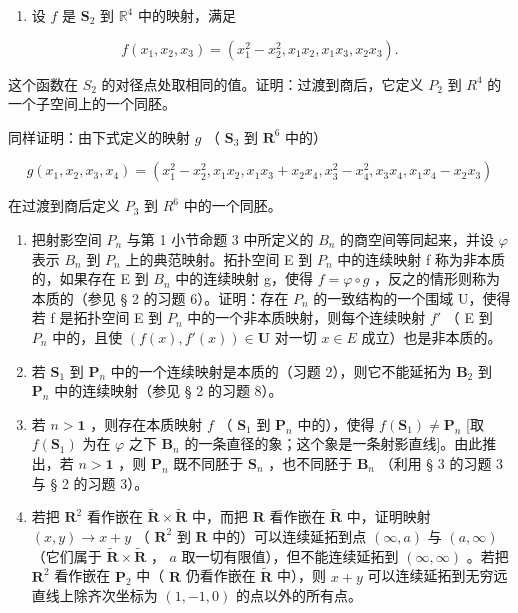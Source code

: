 \ExerciseSection

\begin{enumerate}
\def\labelenumi{\arabic{enumi})}
\tightlist
\item
  设 \(f\) 是 \(\mathbf{S}_2\) 到 \(\mathbb{R}^4\) 中的映射，满足
\end{enumerate}

\[
f \left(x _ {1}, x _ {2}, x _ {3}\right) = \left(x _ {1} ^ {2} - x _ {2} ^ {2}, x _ {1} x _ {2}, x _ {1} x _ {3}, x _ {2} x _ {3}\right).
\]

这个函数在 \(S_{2}\) 的对径点处取相同的值。证明：过渡到商后，它定义 \(P_{2}\) 到 \(R^{4}\) 的一个子空间上的一个同胚。

同样证明：由下式定义的映射 \(g\) （ \(\mathbf{S}_3\) 到 \(\mathbf{R}^6\) 中的）

\[
g \left(x _ {1}, x _ {2}, x _ {3}, x _ {4}\right) = \left(x _ {1} ^ {2} - x _ {2} ^ {2}, x _ {1} x _ {2}, x _ {1} x _ {3} + x _ {2} x _ {4}, x _ {3} ^ {2} - x _ {4} ^ {2}, x _ {3} x _ {4}, x _ {1} x _ {4} - x _ {2} x _ {3}\right)
\]

在过渡到商后定义 \(P_{3}\) 到 \(R^{6}\) 中的一个同胚。

\begin{enumerate}
\def\labelenumi{\arabic{enumi})}
\setcounter{enumi}{1}
\item
  把射影空间 \(P_{n}\) 与第 1 小节命题 3 中所定义的 \(B_{n}\) 的商空间等同起来，并设 \(\varphi\) 表示 \(B_{n}\) 到 \(P_{n}\) 上的典范映射。拓扑空间 E 到 \(P_{n}\) 中的连续映射 f 称为非本质的，如果存在 E 到 \(B_{n}\) 中的连续映射 g，使得 \(f = \varphi \circ g\) ，反之的情形则称为本质的（参见 § 2 的习题 6）。证明：存在 \(P_{n}\) 的一致结构的一个围域 U，使得若 f 是拓扑空间 E 到 \(P_{n}\) 中的一个非本质映射，则每个连续映射 \(f'\) （ E 到 \(P_{n}\) 中的，且使 \((f(x), f'(x)) \in \mathbf{U}\) 对一切 \(x \in E\) 成立）也是非本质的。
\item
  若 \(\mathbf{S}_1\) 到 \(\mathbf{P}_n\) 中的一个连续映射是本质的（习题 2），则它不能延拓为 \(\mathbf{B}_2\) 到 \(\mathbf{P}_n\) 中的连续映射（参见 § 2 的习题 8）。
\item
  若 \(n > \mathbf{1}\) ，则存在本质映射 \(f\) （ \(\mathbf{S}_1\) 到 \(\mathbf{P}_n\) 中的），使得 \(f(\mathbf{S}_1) \neq \mathbf{P}_n\) {[}取 \(f(\mathbf{S}_1)\) 为在 \(\varphi\) 之下 \(\mathbf{B}_n\) 的一条直径的象；这个象是一条射影直线{]}。由此推出，若 \(n > \mathbf{1}\) ，则 \(\mathbf{P}_n\) 既不同胚于 \(\mathbf{S}_n\) ，也不同胚于 \(\mathbf{B}_n\) （利用 § 3 的习题 3 与 § 2 的习题 3）。
\item
  若把 \(\mathbf{R}^2\) 看作嵌在 \(\tilde{\mathbf{R}} \times \tilde{\mathbf{R}}\) 中，而把 \(\mathbf{R}\) 看作嵌在 \(\tilde{\mathbf{R}}\) 中，证明映射 \((x, y) \to x + y\) （ \(\mathbf{R}^2\) 到 \(\mathbf{R}\) 中的）可以连续延拓到点 \((\infty, a)\) 与 \((a, \infty)\) （它们属于 \(\tilde{\mathbf{R}} \times \tilde{\mathbf{R}}\) ， \(a\) 取一切有限值），但不能连续延拓到 \((\infty, \infty)\) 。若把 \(\mathbf{R}^2\) 看作嵌在 \(\mathbf{P}_2\) 中（ \(\mathbf{R}\) 仍看作嵌在 \(\tilde{\mathbf{R}}\) 中），则 \(x + y\) 可以连续延拓到无穷远直线上除齐次坐标为 \((1, -1, 0)\) 的点以外的所有点。
\end{enumerate}

